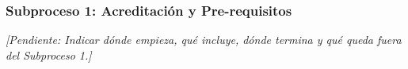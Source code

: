 \subsubsection{Subproceso 1: Acreditación y Pre-requisitos}

\textit{[Pendiente: Indicar dónde empieza, qué incluye, dónde termina y qué queda fuera del Subproceso 1.]}

